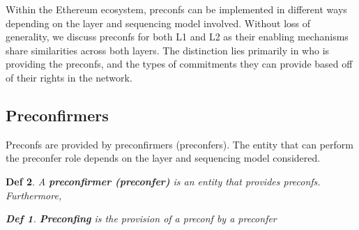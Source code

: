 \documentclass[a4paper]{article}
\theoremstyle{boldstyle}
\newtheorem*{definitionx}{Def}
\newenvironment{definition}
  {\begin{defopenboxq}\begin{definitionx}}
  {\end{definitionx}\end{defopenboxq}}
\newcommand{\cm}[1]{\textcolor{blue}{\textbf{Conor:} #1}}
\begin{document}
    Within the Ethereum ecosystem, preconfs can be implemented in different ways depending on the layer and sequencing model involved. 
    Without loss of generality, we discuss preconfs for both L1 and L2 as their enabling mechanisms share similarities across both layers. The distinction lies primarily in who is providing the preconfs, and the types of commitments they can provide based off of their rights in the network.


    \subsection{Preconfirmers}
        Preconfs are provided by preconfirmers (preconfers). The entity that can perform the preconfer role depends on the layer and sequencing model considered. 
        \begin{definition}
        A \textbf{preconfirmer (preconfer)} is an entity that provides preconfs. Furthermore,
            \begin{definition}
                \textbf{Preconfing} is the provision of a preconf by a preconfer
            \end{definition}
        \end{definition}
\end{document}
